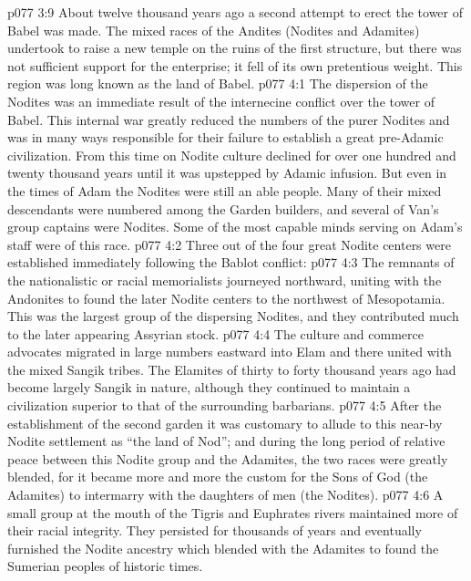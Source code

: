 \pc \vs p077 3:9 About twelve thousand years ago a second attempt to erect the tower of Babel was made. The mixed races of the Andites (Nodites and Adamites) undertook to raise a new temple on the ruins of the first structure, but there was not sufficient support for the enterprise; it fell of its own pretentious weight. This region was long known as the land of Babel.\plusone
{}
\vs p077 4:1 The dispersion of the Nodites was an immediate result of the internecine conflict over the tower of Babel. This internal war greatly reduced the numbers of the purer Nodites and was in many ways responsible for their failure to establish a great pre\hyp{}Adamic civilization. From this time on Nodite culture declined for over one hundred and twenty thousand years until it was upstepped by Adamic infusion. But even in the times of Adam the Nodites were still an able people. Many of their mixed descendants were numbered among the Garden builders, and several of Van’s group captains were Nodites. Some of the most capable minds serving on Adam’s staff were of this race.
\vs p077 4:2 Three out of the four great Nodite centers were established immediately following the Bablot conflict:
\pc \vs p077 4:3 \bibnobreakspace {} The remnants of the nationalistic or racial memorialists journeyed northward, uniting with the Andonites to found the later Nodite centers to the northwest of Mesopotamia. This was the largest group of the dispersing Nodites, and they contributed much to the later appearing Assyrian stock.
\pc \vs p077 4:4 \bibnobreakspace {} The culture and commerce advocates migrated in large numbers eastward into Elam and there united with the mixed Sangik tribes. The Elamites of thirty to forty thousand years ago had become largely Sangik in nature, although they continued to maintain a civilization superior to that of the surrounding barbarians.
\vs p077 4:5 After the establishment of the second garden it was customary to allude to this near\hyp{}by Nodite settlement as “the land of Nod”; and during the long period of relative peace between this Nodite group and the Adamites, the two races were greatly blended, for it became more and more the custom for the Sons of God (the Adamites) to intermarry with the daughters of men (the Nodites).
\pc \vs p077 4:6 \bibnobreakspace {} A small group at the mouth of the Tigris and Euphrates rivers maintained more of their racial integrity. They persisted for thousands of years and eventually furnished the Nodite ancestry which blended with the Adamites to found the Sumerian peoples of historic times.
